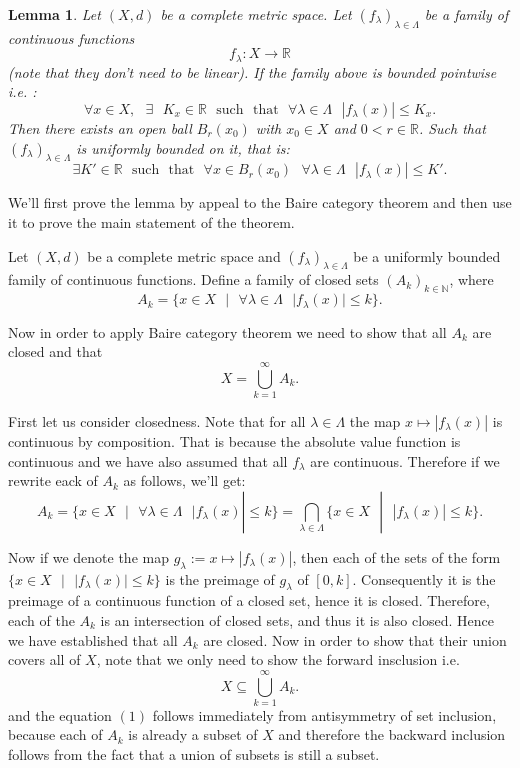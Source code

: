 \documentclass[11pt]{article}
\newcommand\st{\text{ } | \text{ }}
\newcommand\R{\mathbb{R}}
\newcommand\N{\mathbb{N}}
\newcommand\sucht{\sep \mathrm{such} \sep \mathrm{that} \sep}
\newcommand\sep{\text{ }}
\newtheorem*{lemma}{Lemma}
\begin{document}
\begin{lemma}
  Let $\left( X, d \right) $ be a complete metric space. Let
  $\left( f_\lambda \right)_{\lambda \in \Lambda} $ be a family of continuous
  functions $$f_\lambda : X \to \R $$ (note that they don't need to be linear).
  If the family above is bounded pointwise i.e. :
  \[
    \forall x \in X, \sep \exists \sep K_x \in \R \sucht \forall \lambda \in \Lambda \sep |f_\lambda(x)| \le K_x
  .\]
  Then there exists an open ball $B_r(x_0)$ with  $x_0 \in X$ and  $0 < r \in \R$.
  Such that $\left( f_\lambda \right)_{\lambda \in \Lambda} $ is uniformly bounded
  on it, that is:
  \[
    \exists K' \in \R \sucht \forall x \in B_r(x_0) \sep \forall \lambda \in \Lambda \sep |f_\lambda(x) | \le K'
  .\]
\end{lemma}

We'll first prove the lemma by appeal to the Baire category theorem and then
use it to prove the main statement of the theorem.

Let $\left( X, d \right) $ be a complete metric space and
$\left( f_\lambda \right)_{\lambda \in \Lambda} $ be a uniformly bounded family of continuous
functions. Define a family of closed sets $\left( A_k \right)_{k \in \N} $, where
\[
  A_k = \lbrace x \in X \st \forall \lambda \in \Lambda \sep | f_\lambda (x) | \le k \rbrace
.\]

Now in order to apply Baire category theorem we need to show that  all $A_k$ are
closed and that
\begin{equation}
X = \bigcup_{k = 1}^\infty A_k
.\end{equation}

First let us consider closedness. Note that for all $\lambda \in \Lambda$ the map
 $x \mapsto |f_\lambda(x)| $ is continuous by composition. That is because the
 absolute value function is continuous and we have also assumed that all  $f_\lambda$
 are continuous. Therefore if we rewrite eack of  $A_k$ as follows, we'll get:
  \[
    A_k = \lbrace x \in X \st \forall \lambda \in \Lambda \sep | f_\lambda (x) | \le k \rbrace = \bigcap_{\lambda \in \Lambda} \lbrace x \in X \st |f_\lambda(x)| \le k\rbrace
 .\]

 Now if we denote the map $g_\lambda := x \mapsto |f_\lambda(x)| $, then each of the
 sets of the form $\lbrace x \in X \st |f_\lambda(x)| \le k\rbrace$ is the
 preimage of  $g_\lambda$ of  $[0, k]$. Consequently it is the preimage of a
 continuous function of a closed set, hence it is closed. Therefore, each of the
 $A_k$ is an intersection of closed sets, and thus it is also closed.
 Hence we have established that all  $A_k$ are closed. Now in order to show that
 their union covers all of  $X$, note that we only need to show the forward insclusion
 i.e.
 \begin{equation}
    X \subseteq \bigcup_{k = 1}^\infty A_k
  .\end{equation}
 and the equation $(1)$ follows immediately from antisymmetry of set inclusion, because
 each of $A_k$ is already a subset of  $X$ and therefore the backward inclusion follows
 from the fact that a union of subsets is still a subset.
\end{document}
